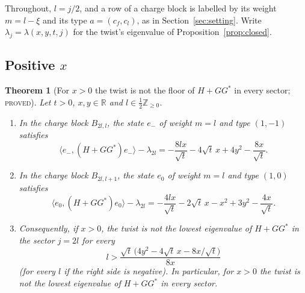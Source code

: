 \documentclass[11pt]{article}
\newtheorem{theorem}{Theorem}[section]
\theoremstyle{definition}
\theoremstyle{remark}
\newcommand{\PROVED}{\textsc{proved}}
\begin{document}
Throughout, $l=j/2$, and a row of a charge block is labelled by its weight $m=l-\xi$ and its type $a=(c_f,c_l)$, as in
Section~\ref{sec:setting}. Write $\lambda_j=\lambda(x,y,t,j)$ for the twist's eigenvalue of
Proposition~\ref{prop:closed}.

\subsection{Positive \texorpdfstring{$x$}{x}}

\begin{theorem}[For $x>0$ the twist is not the floor of $H+GG^*$ in every sector; \PROVED]\label{thm:xpos}
Let $t>0$, $x,y\in\mathbb{R}$ and $l\in\frac12\mathbb{Z}_{\ge0}$.
\begin{enumerate}
  \item In the charge block $B_{2l,l}$, the state $e_-$ of weight $m=l$ and type $(1,-1)$ satisfies
  \[
    \langle e_-,(H+GG^*)e_-\rangle-\lambda_{2l}
      =-\frac{8lx}{\sqrt t}-4\sqrt t\,x+4y^2-\frac{8x}{\sqrt t}.
  \]
  \item In the charge block $B_{2l,l+1}$, the state $e_0$ of weight $m=l$ and type $(1,0)$ satisfies
  \[
    \langle e_0,(H+GG^*)e_0\rangle-\lambda_{2l}
      =-\frac{4lx}{\sqrt t}-2\sqrt t\,x-x^2+3y^2-\frac{4x}{\sqrt t}.
  \]
  \item Consequently, if $x>0$, the twist is not the lowest eigenvalue of $H+GG^*$ in the sector $j=2l$ for every
  \[
    l>\frac{\sqrt t\,\bigl(4y^2-4\sqrt t\,x-8x/\sqrt t\bigr)}{8x}
  \]
  (for every $l$ if the right side is negative). In particular, for $x>0$ the twist is not the lowest eigenvalue of
  $H+GG^*$ in every sector.
\end{enumerate}
\end{theorem}
\end{document}
